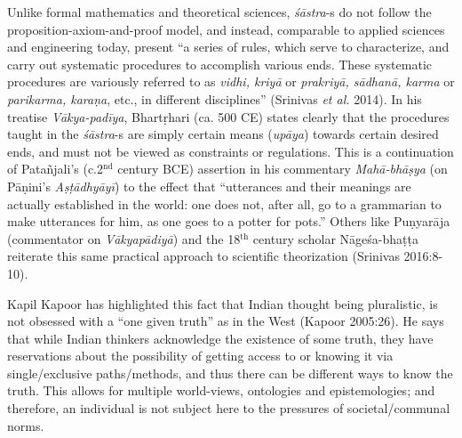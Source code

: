 \newpage

Unlike formal mathematics and theoretical sciences, {\sl śāstra}-s do not follow the proposition-axiom-and-proof model, and instead, comparable to applied sciences and engineering today, present ``a series of rules, which serve to characterize, and carry out systematic procedures to accomplish various ends. These systematic procedures are variously referred to as {\sl vidhi, kriyā} or {\sl prakriyā, sādhanā, karma} or {\sl parikarma, karaṇa}, etc., in different disciplines'' (Srinivas {\sl et al.} 2014). In his treatise {\sl Vākya-padīya}, Bhartṛhari (ca. 500 CE) states clearly that the procedures taught in the {\sl śāstra}-s are simply certain means ({\sl upāya}) towards certain desired ends, and must not be viewed as constraints or regulations. This is a continuation of Patañjali's (c.2$^{\text{nd}}$ century BCE) assertion in his commentary {\sl Mahā-bhāṣya} (on Pāṇini’s {\sl Aṣṭādhyāyī}) to the effect that ``utterances and their meanings are actually established in the world: one does not, after all, go to a grammarian to make utterances for him, as one goes to a potter for pots.'' Others like Puṇyarāja (commentator on {\sl Vākyapādiyā}) and the 18$^{\text{th}}$ century scholar Nāgeśa-bhaṭṭa reiterate this same practical approach to scientific theorization (Srinivas 2016:8-10). 


Kapil Kapoor has highlighted this fact that Indian thought being pluralistic, is not obsessed with a ``one given truth'' as in the West (Kapoor 2005:26). He says that while Indian thinkers acknowledge the existence of some truth, they have reservations about the possibility of getting access to or knowing it via single/exclusive paths/methods, and thus there can be different ways to know the truth. This allows for multiple world-views, ontologies and epistemologies; and therefore, an individual is not subject here to the pressures of societal/communal norms.  

